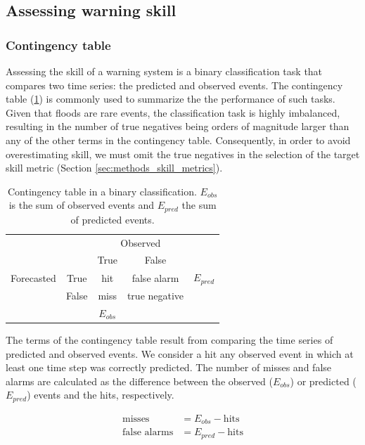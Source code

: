 \documentclass{ametsocV6.1}
\begin{document}
\subsection{Assessing warning skill}
\label{sec:methods_warning_skill}

\subsubsection{Contingency table}
\label{sec:methods_contingency_table}

Assessing the skill of a warning system is a binary classification task that compares two time series: the predicted and observed events. The contingency table (\ref{tab:contingency_table}) is commonly used to summarize the the performance of such tasks. Given that floods are rare events, the classification task is highly imbalanced, resulting in the number of true negatives being orders of magnitude larger than any of the other terms in the contingency table. Consequently, in order to avoid overestimating skill, we must omit the true negatives in the selection of the target skill metric (Section \ref{sec:methods_skill_metrics}). 

\begin{table}
    \centering
    \caption{Contingency table in a binary classification. $E_{obs}$ is the sum of observed events and $E_{pred}$ the sum of predicted events.}
    \begin{tabular}{ccccc}
        \toprule
        & & \multicolumn{2}{c}{Observed} & \\
        \cmidrule{3-4}
        & & True & False & \\
        \midrule
        Forecasted & True & hit & false alarm & $E_{pred}$ \\
        & False & miss & true negative & \\
        &  & $E_{obs}$ & & \\
        \bottomrule
    \end{tabular}
    \label{tab:contingency_table}
\end{table}

The terms of the contingency table result from comparing the time series of predicted and observed events. We consider a hit any observed event in which at least one time step was correctly predicted. The number of misses and false alarms are calculated as the difference between the observed ($E_{obs}$) or predicted ($E_{pred}$) events and the hits, respectively.

\begin{align}
    \label{eq:FN_FP}
    \text{misses} & = E_{obs} - \text{hits} \\
    \text{false alarms} & = E_{pred} - \text{hits}
\end{align}
\end{document}
